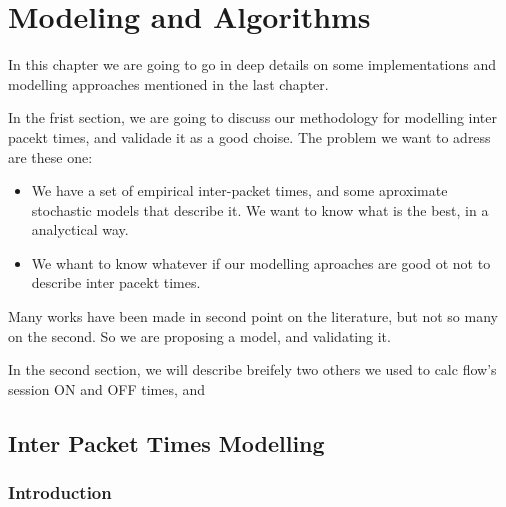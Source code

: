 \chapter{Modeling and Algorithms}\label{ch:modeling-evaluation}

In this chapter we are going to go in deep details on some implementations and modelling approaches mentioned in the last chapter.

In the frist section, we are going to discuss our methodology for modelling inter pacekt times, and validade it as a good choise. The problem we want to adress are these one:

\begin{itemize}
	
	\item We have a set of empirical inter-packet times, and some aproximate stochastic models that describe it. We want to know what is the best, in a analyctical way.
	
	\item We whant to know whatever if our modelling aproaches are good ot not to describe inter pacekt times.

\end{itemize}


Many works have been made in second point on the literature, but not so many on the second. So we are proposing a model, and validating it.

In the second section, we will describe breifely two others we used to calc flow's session ON and OFF times, and  


\section{Inter Packet Times Modelling}

\subsection{Introduction}


